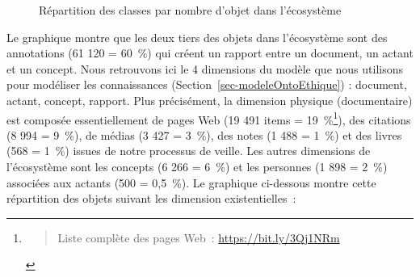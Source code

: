 \documentclass[
  a4paper,
  DIV=11,
  numbers=noendperiod]{scrreprt}
\begin{document}
\begin{figure}


\caption{\label{fig-repartitionClass}Répartition des classes par nombre
d'objet dans l'écosystème}

\end{figure}%

Le graphique montre que les deux tiers des objets dans l'écosystème sont
des annotations (61 120 = 60~\%) qui créent un rapport entre un
document, un actant et un concept. Nous retrouvons ici le 4 dimensions
du modèle que nous utilisons pour modéliser les connaissances
(Section~\ref{sec-modeleOntoEthique}) : document, actant, concept,
rapport. Plus précisément, la dimension physique (documentaire) est
composée essentiellement de pages Web (19 491 items = 19~\%\footnote{\begin{quote}
  Liste complète des pages Web~: \url{https://bit.ly/3Qj1NRm}
  \end{quote}}), des citations (8 994 = 9~\%), de médias (3 427 = 3~\%),
des notes (1 488 = 1~\%) et des livres (568 = 1~\%) issues de notre
processus de veille. Les autres dimensions de l'écosystème sont les
concepts (6 266 = 6~\%) et les personnes (1 898 = 2~\%) associées aux
actants (500 = 0,5~\%). Le graphique ci-dessous montre cette répartition
des objets suivant les dimension existentielles~:
\end{document}
